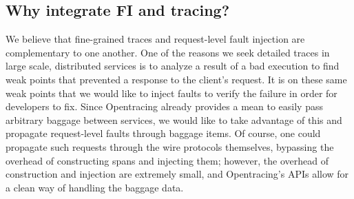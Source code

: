 \subsection{Why integrate FI and tracing?}
We believe that fine-grained traces and request-level fault injection are complementary to one another.
One of the reasons we seek detailed traces in large scale, distributed services is to analyze a result
of a bad execution to find weak points that prevented a response to the client's request. It is on these
same weak points that we would like to inject faults to verify the failure in order for developers to fix.
Since Opentracing already provides a mean to easily pass arbitrary baggage between services, we would like
to take advantage of this and propagate request-level faults through baggage items. Of course, one could propagate such requests through the wire protocols themselves, bypassing the overhead of constructing spans and injecting them; however, the overhead of construction and injection are extremely small, and Opentracing's APIs allow for a clean way of handling the baggage data. 


